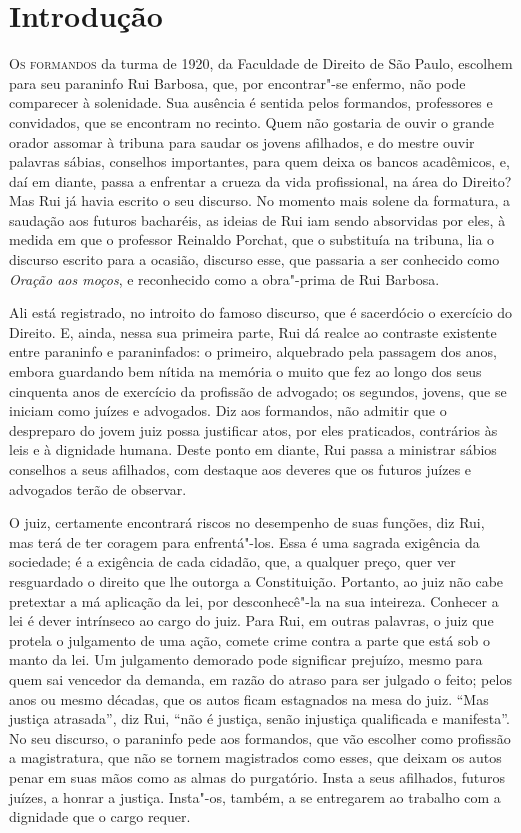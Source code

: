 \chapter[Introdução, \emph{por Pedro Luso}]{Introdução}

\textsc{Os formandos} da turma de 1920, da Faculdade de Direito de São Paulo,
escolhem para seu paraninfo Rui Barbosa, que, por encontrar"-se enfermo,
não pode comparecer à solenidade. Sua ausência é sentida
pelos formandos, professores e convidados, que se encontram no recinto.
Quem não gostaria de ouvir o grande orador assomar à tribuna para
saudar os jovens afilhados, e do mestre ouvir palavras sábias,
conselhos importantes, para quem deixa os bancos acadêmicos, e, daí em
diante, passa a enfrentar a crueza da vida profissional, na área do
Direito? Mas Rui já havia escrito o seu discurso. No momento mais
solene da formatura, a saudação aos futuros bacharéis, as ideias de Rui
iam sendo absorvidas por eles, à medida em que o professor Reinaldo
Porchat, que o substituía na tribuna, lia o discurso escrito para a
ocasião, discurso esse, que passaria a ser conhecido como \textit{Oração aos
moços}, e reconhecido como a obra"-prima de Rui Barbosa. 

Ali está registrado, no introito do
famoso discurso, que é sacerdócio o exercício do Direito. E, ainda,
nessa sua primeira parte, Rui dá realce ao contraste existente entre
paraninfo e paraninfados: o primeiro, alquebrado pela passagem dos
anos, embora guardando bem nítida na memória o muito que fez ao longo
dos seus cinquenta anos de exercício da profissão de advogado; os
segundos, jovens, que se iniciam como juízes e advogados. Diz aos
formandos, não admitir que o despreparo do jovem juiz possa justificar
atos, por eles praticados, contrários às leis e à dignidade humana.
Deste ponto em diante, Rui passa a ministrar
sábios conselhos a seus afilhados, com destaque aos deveres que os
futuros juízes e advogados terão de observar. 

O juiz, certamente encontrará riscos no desempenho de suas funções, diz
Rui, mas terá de ter coragem para enfrentá"-los. Essa é uma sagrada
exigência da sociedade; é a exigência de cada cidadão, que, a qualquer
preço, quer ver resguardado o direito que lhe outorga a Constituição.
Portanto, ao juiz não cabe pretextar a má aplicação da lei, por
desconhecê"-la na sua inteireza. Conhecer a lei é dever intrínseco ao
cargo do juiz. Para Rui, em outras palavras, o juiz que protela o
julgamento de uma ação, comete crime contra a parte que está sob o
manto da lei. Um julgamento demorado pode significar prejuízo, mesmo
para quem sai vencedor da demanda, em razão do atraso para ser julgado
o feito; pelos anos ou mesmo décadas, que os autos ficam estagnados na
mesa do juiz. ``Mas justiça atrasada'', diz Rui, ``não é justiça, senão
injustiça qualificada e manifesta''. No seu discurso, o paraninfo pede
aos formandos, que vão escolher como profissão a magistratura, que não
se tornem magistrados como esses, que deixam os autos penar em suas
mãos como as almas do purgatório. Insta a seus afilhados, futuros
juízes, a honrar a justiça. Insta"-os, também, a se entregarem ao
trabalho com a dignidade que o cargo requer. 


